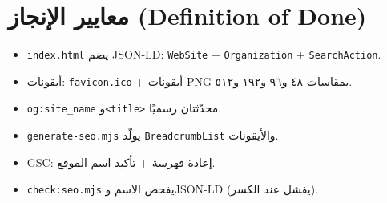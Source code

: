 \documentclass[11pt]{article}
\newcommand{\code}[1]{\textcolor{darkbg}{\texttt{\small #1}}}
\begin{document}
\section{معايير الإنجاز (Definition of Done)}
\begin{okbox}
\begin{itemize}
\item[\faCheck] \code{index.html} يضم JSON-LD: \code{WebSite} + \code{Organization} + \code{SearchAction}.
\item[\faCheck] أيقونات: \code{favicon.ico} + أيقونات PNG بمقاسات ٤٨ و٩٦ و١٩٢ و٥١٢.
\item[\faCheck] \code{og:site\_name} و\code{<title>} محدّثتان رسميًا.
\item[\faCheck] \code{generate-seo.mjs} يولّد \code{BreadcrumbList} والأيقونات.
\item[\faCheck] GSC: إعادة فهرسة + تأكيد اسم الموقع.
\item[\faCheck] \code{check:seo.mjs} يفحص الاسم وJSON-LD (يفشل عند الكسر).
\end{itemize}
\end{okbox}

\end{document}
